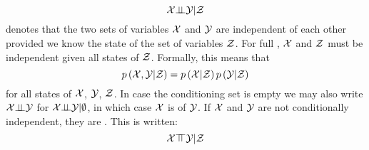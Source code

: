 \begin{defi}
\begin{equation}
\mathcal{X}\bot\!\!\!\bot\mathcal{Y}|\mathcal{Z}
\end{equation}
denotes that the two sets of variables $\mathcal{X}$ and $\mathcal{Y}$ are independent of each other provided we know the state of the set of variables $\mathcal{Z}$. For full , $\mathcal{X}$ and $\mathcal{Z}$ must be independent given all states of $\mathcal{Z}$. Formally, this means that
\begin{equation}
p\left(\mathcal{X},\mathcal{Y}|\mathcal{Z}\right)=p\left(\mathcal{X}|\mathcal{Z}\right)p\left(\mathcal{Y}|\mathcal{Z}\right)
\end{equation}
for all states of $\mathcal{X}$, $\mathcal{Y}$, $\mathcal{Z}$. In case the conditioning set is empty we may also write $\mathcal{X}\bot\!\!\!\bot\mathcal{Y}$ for $\mathcal{X}\bot\!\!\!\bot\mathcal{Y}|\emptyset$, in which case $\mathcal{X}$ is  of $\mathcal{Y}$. If $\mathcal{X}$ and $\mathcal{Y}$ are not conditionally independent, they are . This is written:
\begin{equation}
\mathcal{X}\top\!\!\!\top\mathcal{Y}|\mathcal{Z}
\end{equation}
\cite{Barber2011}
\end{defi}